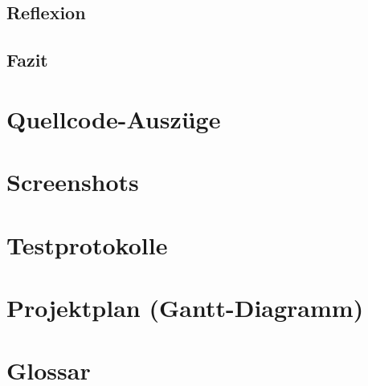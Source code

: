 \documentclass[11pt,a4paper]{article}
\begin{document}
\subsection{Reflexion}

\subsection{Fazit}

\appendix

\section{Quellcode-Auszüge}

\section{Screenshots}

\section{Testprotokolle}

\section{Projektplan (Gantt-Diagramm)}

\section{Glossar}

\begin{thebibliography}{99}
\end{thebibliography}
\end{document}
